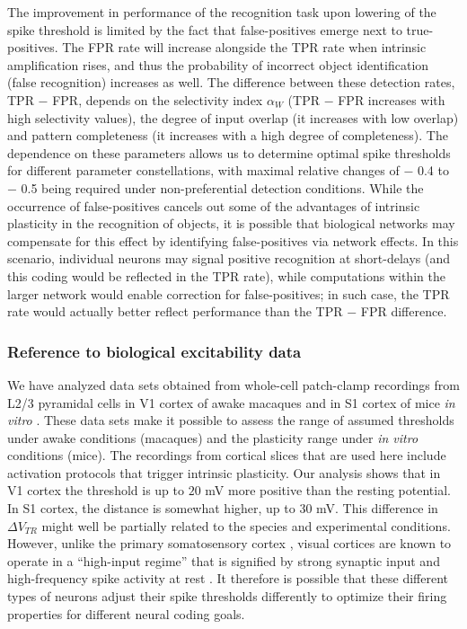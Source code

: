 The improvement in performance of the recognition task upon lowering of the spike threshold is limited
        by the fact that false-positives emerge next to true-positives.
    The FPR rate will increase alongside the TPR rate when intrinsic amplification rises,
        and thus the probability of incorrect object identification (false recognition) increases as well.
    The difference between these detection rates, TPR $-$ FPR, depends on
        the selectivity index $\alpha_W$ (TPR $-$ FPR increases with high selectivity values),
        the degree of input overlap (it increases with low overlap)
        and pattern completeness (it increases with a high degree of completeness).
    The dependence on these parameters allows us to determine optimal spike thresholds
        for different parameter constellations,
        with maximal relative changes of $-$ 0.4 to $-$ 0.5 being required under non-preferential detection conditions.
    While the occurrence of false-positives cancels out
            some of the advantages of intrinsic plasticity in the recognition of objects,
        it is possible that biological networks may compensate for this effect by
            identifying false-positives via network effects.
    In this scenario, individual neurons may signal positive recognition at short-delays
        (and this coding would be reflected in the TPR rate),
        while computations within the larger network would enable correction for false-positives;
        in such case, the TPR rate would actually better reflect performance than the TPR $-$ FPR difference.

\subsubsection*{Reference to biological excitability data}

We have analyzed data sets obtained from
        whole-cell patch-clamp recordings from L2/3 pyramidal cells in V1 cortex of awake macaques \citep{Li2020-ej}
        and in S1 cortex of mice \textit{in vitro} \citep{Gill2020-wy}.
    These data sets make it possible to assess
        the range of assumed thresholds under awake conditions (macaques)
        and the plasticity range under \textit{in vitro} conditions (mice).
    The recordings from cortical slices that are used here include
        activation protocols that trigger intrinsic plasticity.
    Our analysis shows that in V1 cortex the threshold is up to $20$ mV more positive than the resting potential.
    In S1 cortex, the distance is somewhat higher, up to $30$ mV.
    This difference in $\Delta V_{TR}$ might well be partially related to the species and experimental conditions.
    However, unlike the primary somatosensory cortex \citep{Brecht2003-vf},
        visual cortices are known to operate in a ``high-input regime'' that is signified by
            strong synaptic input
            and high-frequency spike activity at rest \citep{Shadlen1998-je}.
    It therefore is possible that these different types of neurons
        adjust their spike thresholds differently
        to optimize their firing properties for different neural coding goals.

